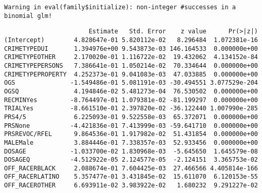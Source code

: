 \documentclass[
  letterpaper,
  DIV=11,
  numbers=noendperiod]{scrartcl}
\newenvironment{Shaded}{\begin{snugshade}}{\end{snugshade}}
\newcommand{\DecValTok}[1]{\textcolor[rgb]{0.68,0.00,0.00}{#1}}
\newcommand{\FunctionTok}[1]{\textcolor[rgb]{0.28,0.35,0.67}{#1}}
\newcommand{\NormalTok}[1]{\textcolor[rgb]{0.00,0.23,0.31}{#1}}
\newcommand{\SpecialCharTok}[1]{\textcolor[rgb]{0.37,0.37,0.37}{#1}}
\begin{document}
\begin{verbatim}
Warning in eval(family$initialize): non-integer #successes in a binomial glm!
\end{verbatim}

\begin{Shaded}
\end{Shaded}

\begin{verbatim}
                       Estimate   Std. Error    z value      Pr(>|z|)
(Intercept)        4.828647e-01 5.820112e-02   8.296484  1.072381e-16
CRIMETYPEDUI       1.394976e+00 9.543873e-03 146.164533  0.000000e+00
CRIMETYPEOTHER     2.170020e-01 1.116722e-02  19.432062  4.134152e-84
CRIMETYPEPERSONS   7.386641e-01 1.050214e-02  70.334644  0.000000e+00
CRIMETYPEPROPERTY  4.252373e-01 9.041083e-03  47.033885  0.000000e+00
OGS               -1.549486e-01 5.081191e-03 -30.494551 3.077529e-204
OGSQ               4.194846e-02 5.481273e-04  76.530502  0.000000e+00
RECMINYes         -8.764497e-01 1.079381e-02 -81.199297  0.000000e+00
TRIALYes          -8.661510e-01 2.397820e-02 -36.122440 1.007990e-285
PRS4/5             6.225093e-01 9.522558e-03  65.372071  0.000000e+00
PRSNone           -4.421836e-01 7.413999e-03 -59.641710  0.000000e+00
PRSREVOC/RFEL      9.864536e-01 1.917982e-02  51.431854  0.000000e+00
MALEMale           3.884446e-01 7.338357e-03  52.933456  0.000000e+00
DOSAGE            -1.033700e-02 1.830968e-03  -5.645650  1.645579e-08
DOSAGEQ           -4.512922e-05 2.124577e-05  -2.124151  3.365753e-02
OFF_RACERBLACK     2.088674e-01 7.604425e-03  27.466566 4.405814e-166
OFF_RACERLATINO    5.357477e-01 3.431845e-02  15.611070  6.120153e-55
OFF_RACEROTHER     6.693911e-02 3.983922e-02   1.680232  9.291227e-02
\end{verbatim}

\begin{Shaded}
\end{Shaded}
\end{document}
